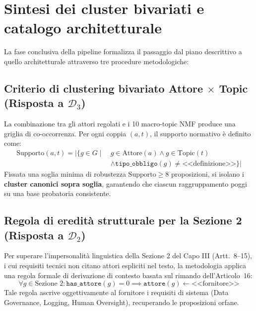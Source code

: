 \documentclass[12pt,a4paper,oneside]{report}
\begin{document}
\section{Sintesi dei cluster bivariati e catalogo architetturale}
\label{sec:sintesi_cluster_metodologia}

La fase conclusiva della pipeline formalizza il passaggio dal piano descrittivo a quello architetturale attraverso tre procedure metodologiche:

\subsection{Criterio di clustering bivariato \texorpdfstring{Attore $\times$ Topic (Risposta a $\mathcal{D}_3$)}{Attore x Topic (Risposta a D3)}}
La combinazione tra gli attori regolati e i 10 macro-topic NMF produce una griglia di co-occorrenza. Per ogni coppia $(a, t)$, il supporto normativo è definito come:
\begin{equation}
\begin{aligned}
    \text{Supporto}(a, t) = \big|\{g \in G \mid\ & g \in \text{Attore}(a) \land g \in \text{Topic}(t) \\
    & \land \texttt{tipo\_obbligo}(g) \ne \text{<<definizione>>}\}\big|
\end{aligned}
\end{equation}
Fissata una soglia minima di robustezza $\text{Supporto} \ge 8$ proposizioni, si isolano i \textbf{cluster canonici sopra soglia}, garantendo che ciascun raggruppamento poggi su una base probatoria consistente.

\subsection{Regola di eredità strutturale per la Sezione 2 (Risposta a \texorpdfstring{$\mathcal{D}_2$}{D2})}
Per superare l'impersonalità linguistica della Sezione 2 del Capo III (Artt.~8--15), i cui requisiti tecnici non citano attori espliciti nel testo, la metodologia applica una regola formale di derivazione di contesto basata sul rimando dell'Articolo~16:
\begin{equation}
    \forall g \in \text{Sezione 2} : \texttt{has\_attore}(g) = 0 \implies \texttt{attore}(g) \leftarrow \text{<<fornitore>>}
\end{equation}
Tale regola ascrive oggettivamente al fornitore i requisiti di sistema (Data Governance, Logging, Human Oversight), recuperando le proposizioni orfane.
\end{document}
